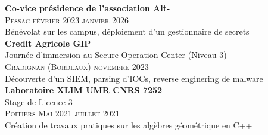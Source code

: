 \documentclass[oneside]{article}
\begin{document}
{\begin{minipage}[t][\dimexpr\textheight-2\fboxrule-2\fboxsep\relax][t]{\dimexpr0.6\textwidth-2\fboxrule-2\fboxsep\relax}
    {\large \textbf{Co-vice présidence de l'association Alt-}} \\
    {\scshape{}\selectfont Pessac \qquad février 2023 \textendash{} janvier 2026} \\
    {\small Bénévolat sur les campus, déploiement d'un gestionnaire de secrets} \\[2ex]
    
    {\large \textbf{Credit Agricole GIP}} \\ 
    {{\selectfont Journée d’immersion au Secure Operation Center (Niveau 3)}} \\
    {\scshape{}\selectfont Gradignan (Bordeaux) \qquad novembre 2023} \\
    {\small Découverte d'un SIEM, parsing d'IOCs, reverse enginering de malware} \\[2ex]
    
    {\large \textbf{Laboratoire XLIM UMR CNRS 7252} } \\ 
    {{\selectfont Stage de Licence 3}} \\
    {\scshape{}\selectfont Poitiers \quad{} Mai 2021 \textendash{} juillet 2021} \\
    {\small Création de travaux pratiques sur les algèbres géométrique en C++} \\[2ex]
  
    
    

\end{minipage}}
\end{document}
